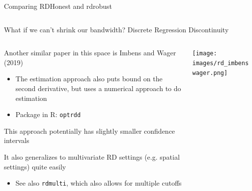 \documentclass[notes,11pt, aspectratio=169]{beamer}
\newenvironment{wideitemize}{\itemize\addtolength{\itemsep}{10pt}}{\enditemize}
\begin{document}
\begin{frame}{Comparing RDHonest and rdrobust}
\begin{columns}[onlytextwidth, T]
\begin{column}{.7\textwidth}
      \end{column}%
    \end{columns}
\end{frame}



\begin{frame}{What if we can't shrink our bandwidth? Discrete Regression Discontinuity}
    \begin{columns}[onlytextwidth, T] %
      \begin{column}{.6\textwidth}
        \begin{wideitemize}
        \item Another similar paper in this space is Imbens and Wager
          (2019)
          \begin{itemize}
          \item The estimation approach also puts bound on the second
            derivative, but uses a numerical approach to do estimation
          \item Package in R: \texttt{optrdd}
          \end{itemize}
        \item This approach potentially has slightly smaller confidence intervals
        \item It also generalizes to multivariate RD settings
          (e.g. spatial settings) quite easily
          \begin{itemize}
          \item See also \texttt{rdmulti}, which also allows for multiple cutoffs
          \end{itemize}
        \end{wideitemize}
      \end{column}%
      \hfill%
      \begin{column}{.4\textwidth}
        \texttt{[image: images/rd\_imbenswager.png]}
      \end{column}%
    \end{columns}
\end{frame}
\end{document}
